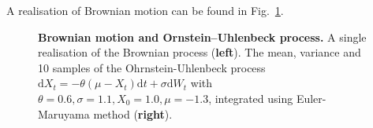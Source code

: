 \noindent
A realisation of Brownian motion can be found in Fig.~\ref{fig:sp-brown}.
\begin{figure}[h]
	\centering
	\caption[Brownian motion and Ornstein–Uhlenbeck process
	]{\textbf{Brownian motion and Ornstein–Uhlenbeck process.} 
		A single realisation of the Brownian process (\textbf{left}). The mean, variance and 10 samples of the Ohrnstein-Uhlenbeck process $\mathrm{d} X_{t}=-\theta (\mu - X_{t}) \mathrm{d} t+\sigma \mathrm{d} W_{t}$ with $\theta=0.6, \sigma=1.1, X_0=1.0, \mu=-1.3$, integrated using Euler-Maruyama method (\textbf{right}).}
	\label{fig:sp-brown}
\end{figure}

